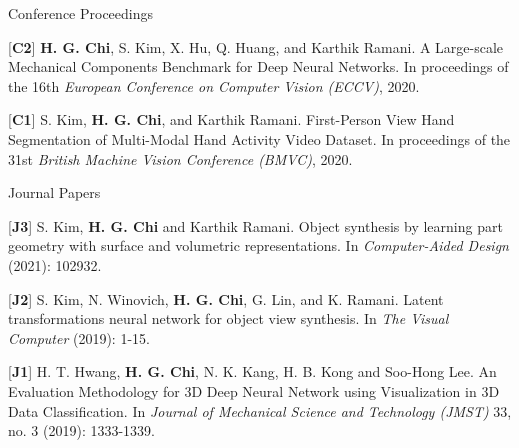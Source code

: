


\begin{cventries}
\cvpub
{Conference Proceedings} %
{ %
\begin{cvitems}
\item {[\textbf{C2}] \textbf{H. G. Chi}, S. Kim, X. Hu, Q. Huang, and Karthik Ramani. A Large-scale Mechanical Components Benchmark for Deep Neural Networks. In proceedings of the 16th \textit{European Conference on Computer Vision (ECCV)}, 2020.}
\item {[\textbf{C1}] S. Kim, \textbf{H. G. Chi}, and Karthik Ramani. First-Person View Hand Segmentation of Multi-Modal Hand Activity Video Dataset. In proceedings of the 31st \textit{British Machine Vision Conference (BMVC)}, 2020.}
\end{cvitems}
}


\cvpub
{Journal Papers} %
{ %
\begin{cvitems}
\item {[\textbf{J3}] S. Kim, \textbf{H. G. Chi} and Karthik Ramani. Object synthesis by learning part geometry with surface and volumetric representations. In \textit{Computer-Aided Design} (2021): 102932.}
\item {[\textbf{J2}] S. Kim, N. Winovich, \textbf{H. G. Chi}, G. Lin, and K. Ramani. Latent transformations neural network for object view synthesis. In \textit{The Visual Computer} (2019): 1-15.}
\item {[\textbf{J1}] H. T. Hwang, \textbf{H. G. Chi}, N. K. Kang, H. B. Kong and Soo-Hong Lee. An Evaluation Methodology for 3D Deep Neural Network using Visualization in 3D Data Classification. In \textit{Journal of Mechanical Science and Technology (JMST)} 33, no. 3 (2019): 1333-1339.}
\end{cvitems}
}


\end{cventries}
